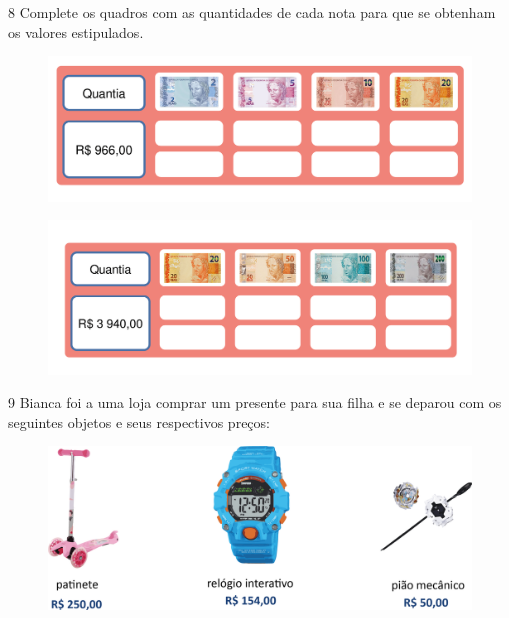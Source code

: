 
\num{8}  Complete os quadros com as quantidades de cada nota para que se
obtenham os valores estipulados.

\begin{figure}[htpb!]
\centering
\includegraphics[width=\textwidth]{./media/image69.png}
\end{figure}

\begin{figure}[htpb!]
\centering
\includegraphics[width=\textwidth]{./media/image70.png}
\end{figure}


\pagebreak
\num{9} Bianca foi a uma loja comprar um presente para sua filha e se deparou
com os seguintes objetos e seus respectivos preços:

\begin{figure}[htpb!]
\centering
\includegraphics[width=\textwidth]{./media/image72.png}
\end{figure}

